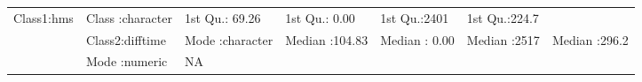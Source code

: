 \documentclass[]{article}
\begin{document}
\begin{longtable}[]{@{}lllllll@{}}
\begin{minipage}[t]{0.14\columnwidth}
Class1:hms\strut
\end{minipage} & \begin{minipage}[t]{0.15\columnwidth}\raggedright\strut
Class :character\strut
\end{minipage} & \begin{minipage}[t]{0.13\columnwidth}\raggedright\strut
1st Qu.: 69.26\strut
\end{minipage} & \begin{minipage}[t]{0.13\columnwidth}\raggedright\strut
1st Qu.: 0.00\strut
\end{minipage} & \begin{minipage}[t]{0.11\columnwidth}\raggedright\strut
1st Qu.:2401\strut
\end{minipage} & \begin{minipage}[t]{0.12\columnwidth}\raggedright\strut
1st Qu.:224.7\strut
\end{minipage}\tabularnewline
\begin{minipage}[t]{0.03\columnwidth}\raggedright\strut
\strut
\end{minipage} & \begin{minipage}[t]{0.14\columnwidth}\raggedright\strut
Class2:difftime\strut
\end{minipage} & \begin{minipage}[t]{0.15\columnwidth}\raggedright\strut
Mode :character\strut
\end{minipage} & \begin{minipage}[t]{0.13\columnwidth}\raggedright\strut
Median :104.83\strut
\end{minipage} & \begin{minipage}[t]{0.13\columnwidth}\raggedright\strut
Median : 0.00\strut
\end{minipage} & \begin{minipage}[t]{0.11\columnwidth}\raggedright\strut
Median :2517\strut
\end{minipage} & \begin{minipage}[t]{0.12\columnwidth}\raggedright\strut
Median :296.2\strut
\end{minipage}\tabularnewline
\begin{minipage}[t]{0.03\columnwidth}\raggedright\strut
\strut
\end{minipage} & \begin{minipage}[t]{0.14\columnwidth}\raggedright\strut
Mode :numeric\strut
\end{minipage} & \begin{minipage}[t]{0.15\columnwidth}\raggedright\strut
NA\strut

\end{minipage}
\end{longtable}
\end{document}
